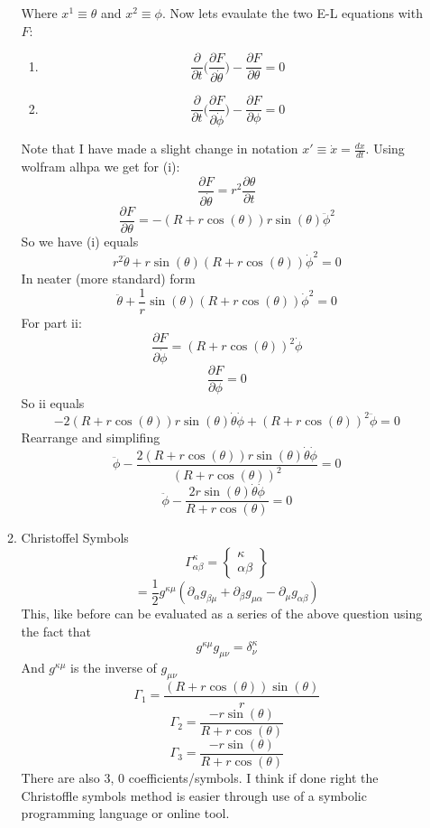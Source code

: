 \documentclass[12pt]{article}
\begin{document}
\begin{enumerate}
\begin{enumerate}
Where $x^1 \equiv \theta$ and $ x^2 \equiv \phi$. Now lets evaulate the two E-L equations with $F$:
\begin{enumerate}
  \item $$ \frac{\partial}{\partial t} \Big( \frac{\partial F}{\partial \dot{\theta} } \Big) - \frac{\partial F}{\partial \theta} = 0 $$
  \item $$ \frac{\partial }{\partial t} \Big( \frac{\partial F}{\partial \dot{\phi}} \Big) - \frac{\partial F}{\partial \phi} = 0 $$
\end{enumerate} 
Note that I have made a slight change in notation $ x' \equiv \dot{x} = \frac{d x}{dt}$. Using wolfram alhpa we get for (i):
$$ \frac{\partial F}{\partial \dot{\theta} } = r^2 \frac{\partial \theta}{\partial t} $$
$$ \frac{\partial F}{\partial \theta} = - (R+ r \cos(\theta)) r \sin(\theta) \ddot{\phi}^2 $$
So we have (i) equals 
$$ r^2 \ddot{\theta} +r \sin(\theta) ( R+ r \cos(\theta)) \dot{\phi}^2 = 0 $$
In neater (more standard) form 
$$ \ddot{\theta} + \frac{1}{r} \sin(\theta) ( R+ r \cos(\theta)) \dot{\phi}^2 = 0 $$
For part ii: 
$$ \frac{\partial F}{\partial \dot{\phi} } = (R+ r \cos(\theta))^2 \dot{\phi} $$
$$ \frac{\partial F}{\partial \phi} = 0 $$
So ii equals 
$$ -2( R+ r \cos( \theta)) r \sin(\theta) \dot{\theta} \dot{\phi} + (R+ r \cos(\theta))^2 \ddot{\phi} = 0 $$
Rearrange and simplifing 
$$ \ddot{\phi} - \frac{ 2 (R+ r \cos(\theta)) r \sin(\theta) \dot{\theta} \dot{\phi}}{(R + r \cos (\theta)) ^2 } = 0 $$
$$ \ddot{\phi} - \frac{ 2 r \sin(\theta) \dot{\theta} \dot{\phi}}{R+ r \cos(\theta) } = 0 $$ 
\item  Christoffel Symbols 
$$ \Gamma^{\kappa}_{\alpha \beta} = \begin{Bmatrix}
  \kappa \\ \alpha \beta 
\end{Bmatrix} $$
$$ = \frac{1}{2} g^{\kappa \mu} ( \partial_{\alpha} g_{\beta \mu} + \partial_{\beta} g_{\mu \alpha} - \partial_{\mu} g_{\alpha \beta} ) $$
This, like before can be evaluated as a series of the above question using the fact that 
$$ g^{\kappa \mu}g_{\mu \nu} = \delta^\kappa_\nu $$
And $g^{\kappa \mu}$ is the inverse of $g_{\mu\nu}$ 
$$ \Gamma_1 = \frac{(R+ r \cos(\theta)) \sin(\theta) }{r} $$
$$ \Gamma_2 = \frac{- r \sin(\theta) }{R + r \cos(\theta) } $$
$$ \Gamma_3 = \frac{- r \sin(\theta) }{R + r \cos(\theta) } $$ 
There are also 3, 0 coefficients/symbols. I think if done right the Christoffle symbols method is easier through use of a symbolic programming language or online tool. 


\end{enumerate}
\end{enumerate}
\end{document}

